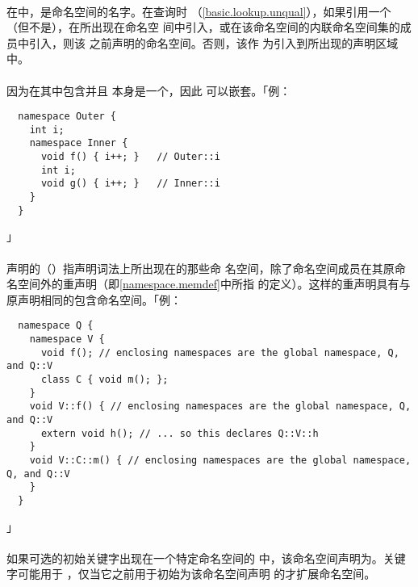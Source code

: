 \paragraph{}
在中，是命名空间的名字。在查询时
（\ref{basic.lookup.unqual}），如果引用一个
（但不是），在所出现在命名空
间中引入，或在该命名空间的内联命名空间集的成员中引入，则该
之前声明的命名空间。否则，该作
为引入到所出现的声明区域中。

\paragraph{}
因为在其中包含并且
本身是一个，因此
可以嵌套。「例：
\begin{lstlisting}
  namespace Outer {
    int i;
    namespace Inner {
      void f() { i++; }   // Outer::i
      int i;
      void g() { i++; }   // Inner::i
    }
  }
\end{lstlisting}」

\paragraph{}
声明的（）指声明词法上所出现在的那些命
名空间，除了命名空间成员在其原命名空间外的重声明（即\ref{namespace.memdef}中所指
的定义）。这样的重声明具有与原声明相同的包含命名空间。「例：
\begin{lstlisting}
  namespace Q {
    namespace V {
      void f(); // enclosing namespaces are the global namespace, Q, and Q::V
      class C { void m(); };
    }
    void V::f() { // enclosing namespaces are the global namespace, Q, and Q::V
      extern void h(); // ... so this declares Q::V::h
    }
    void V::C::m() { // enclosing namespaces are the global namespace, Q, and Q::V
    }
  }
\end{lstlisting}」

\paragraph{}
如果可选的初始关键字出现在一个特定命名空间的
中，该命名空间声明为。关键字可能用于
，仅当它之前用于初始为该命名空间声明
的才扩展命名空间。

